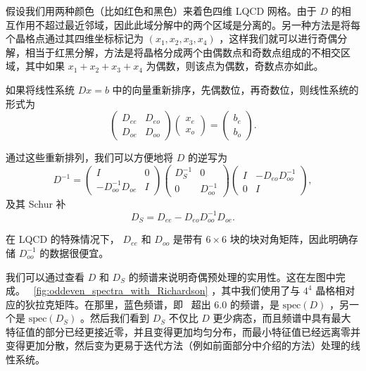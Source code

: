 \documentclass[5p,times,a4paper,fleqn]{cas-dc}
\begin{document}
假设我们用两种颜色（比如红色和黑色）来着色四维 LQCD 网格。由于    $D$    的相互作用不超过最近邻域，因此此域分解中的两个区域是分离的。另一种方法是将每个晶格点通过其四维坐标标记为    $(x_{1},x_{2},x_{3},x_{4})$    ，这样我们就可以进行奇偶分解，相当于红黑分解，方法是将晶格分成两个由偶数点和奇数点组成的不相交区域，其中如果    $x_{1}+x_{2}+x_{3}+x_{4}$    为偶数，则该点为偶数，奇数点亦如此。  

如果将线性系统    $Dx=b$    中的向量重新排序，先偶数位，再奇数位，则线性系统的形式为
   \begin{equation}
    \begin{pmatrix}
    D_{ee} & D_{eo} \\ 
    D_{oe} & D_{oo}
    \end{pmatrix}
    \begin{pmatrix}
    x_{e} \\ 
    x_{o}
    \end{pmatrix}
    =
    \begin{pmatrix}
    b_{e} \\ 
    b_{o}
    \end{pmatrix}.
\end{equation}     

通过这些重新排列，我们可以方便地将    $D$    的逆写为    \cite{saad2003iterative}    
   \begin{equation} \label{eq:Dinv_in_factorized_form}
    D^{-1}=
    \begin{pmatrix}
    I & 0 \\ 
    -D_{oo}^{-1}D_{oe} & I
    \end{pmatrix}
    \begin{pmatrix}
    D_{S}^{-1} & 0 \\ 
    0 & D_{oo}^{-1}
    \end{pmatrix}
    \begin{pmatrix}
    I & -D_{eo}D_{oo}^{-1} \\ 
    0 & I
    \end{pmatrix},
\end{equation}    及其 Schur 补
   \begin{equation} \label{eq:schur_complement}
    D_{S} = D_{ee} - D_{eo} D_{oo}^{-1} D_{oe}.
\end{equation}     

在 LQCD 的特殊情况下，   $D_{ee}$    和    $D_{oo}$    是带有    $6 \times 6$    块的块对角矩阵，因此明确存储    $D_{oo}^{-1}$    的数据很便宜。  

我们可以通过查看    $D$    和    $D_{S}$    的频谱来说明奇偶预处理的实用性。这在左图中完成。 \     \ref{fig:oddeven_spectra_with_Richardson}    ，其中我们使用了与    $4^4$    晶格相对应的狄拉克矩阵。在那里，蓝色频谱，即 \  超出 6.0 的频谱，是    $\mathrm{spec}(D)$    ，另一个是    $\mathrm{spec}(D_{S})$    。然后我们看到    $D_{S}$    不仅比    $D$    更少病态，而且频谱中具有最大特征值的部分已经更接近零，并且变得更加均匀分布，而最小特征值已经远离零并变得更加分散，然后变为更易于迭代方法（例如前面部分中介绍的方法）处理的线性系统。  
\end{document}
